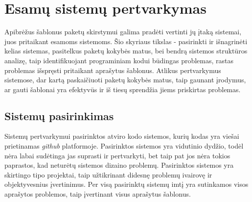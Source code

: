 \section{Esamų sistemų pertvarkymas}
Apibrėžus šablonus paketų skirstymui galima pradėti vertinti jų įtaką sistemai, juos pritaikant esamoms sistemoms.
Šio skyriaus tikslas - pasirinkti ir išnagrinėti kelias sistemas, pasitelkus paketų kokybės matus, bei bendrą sistemos struktūros analizę,
taip identifikuojant programiniam kodui būdingas problemas, rastas problemas išspręsti pritaikant aprašytus šablonus.
Atlikus pertvarkymus sistemose, dar kartą paskaičiuoti paketų kokybės matus,
taip gaunant įrodymus, ar gauti šablonai yra efektyvūs ir iš tiesų sprendžia
jiems priskirtas problemas.


\subsection{Sistemų pasirinkimas}
Sistemų pertvarkymui pasirinktos atviro kodo sistemos, kurių kodas yra viešai prietinamas \textit{github} platformoje.
Pasirinktos sistemos yra vidutinio dydžio, todėl nėra labai sudėtinga jas suprasti ir pertvarkyti, bet taip pat jos nėra
tokios paprastos, kad neturėtų sistemos dizaino problemų.
Pasirinktos sistemos yra skirtingo tipo projektai, taip užtikrinant didesnę problemų ivairovę ir objektyvesnius įvertinimus.
Per visą pasirinktų sistemų imtį yra sutinkamos visos aprašytos problemos, taip įvertinant visus aprašytus šablonus.

